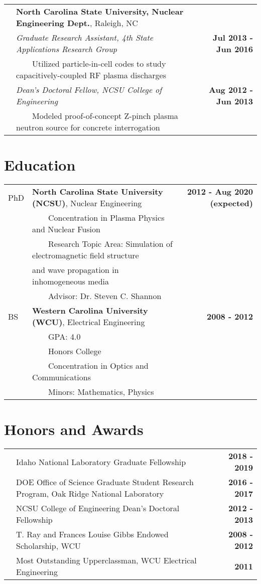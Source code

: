 \documentclass{article}
\newcommand{\tabitem}{~~\textbullet~~}
\begin{document}
\begin{tabularx}{\textwidth}{l X r}
	& \textbf{North Carolina State University, Nuclear Engineering Dept.}, Raleigh, NC & \\
	& \textit{Graduate Research Assistant, 4th State Applications Research Group} & \textbf{Jul 2013 - Jun 2016} \\
	& \tabitem Utilized particle-in-cell codes to study capacitively-coupled RF plasma discharges & \\
	& \textit{Dean's Doctoral Fellow, NCSU College of Engineering} & \textbf{Aug 2012 - Jun 2013} \\
	& \tabitem Modeled proof-of-concept Z-pinch plasma neutron source for concrete interrogation & \\
\end{tabularx}

\section*{Education}

	\begin{tabularx}{\textwidth}{l X r}
	PhD 		 & \textbf{North Carolina State University (NCSU)}, Nuclear Engineering &  \textbf{2012 - Aug 2020 (expected)} \\
				 & \tabitem Concentration in Plasma Physics and Nuclear Fusion & \\
				 & \tabitem Research Topic Area: Simulation of electromagnetic field structure & \\
				 & \hspace{1.5em} and wave propagation in inhomogeneous media & \\
				 & \tabitem Advisor: Dr. Steven C. Shannon & \\
	BS			 & \textbf{Western Carolina University (WCU)}, Electrical Engineering  & \textbf{2008 - 2012} \\
				 & \tabitem GPA: 4.0 & \\
				 & \tabitem Honors College & \\
				 & \tabitem Concentration in Optics and Communications & \\
				 & \tabitem Minors: Mathematics, Physics &
	\end{tabularx}

\section*{Honors and Awards}

	\begin{tabularx}{\textwidth}{l X r}
		\hspace{2em} & Idaho National Laboratory Graduate Fellowship & \textbf{2018 - 2019} \\
					 & DOE Office of Science Graduate Student Research Program, Oak Ridge National Laboratory & \textbf{2016 - 2017} \\
					 & NCSU College of Engineering Dean's Doctoral Fellowship & \textbf{2012 - 2013} \\
					 & T. Ray and Frances Louise Gibbs Endowed Scholarship, WCU & \textbf{2008 - 2012} \\
					 & Most Outstanding Upperclassman, WCU Electrical Engineering & \textbf{2011}
	\end{tabularx}
\end{document}
